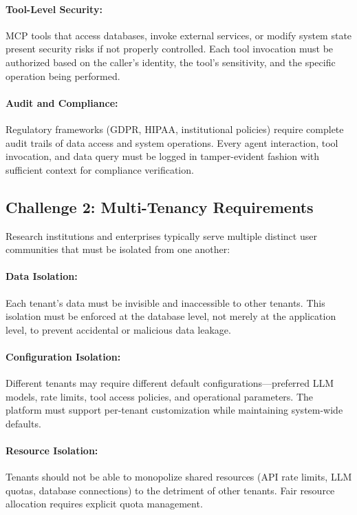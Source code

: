 \paragraph{Tool-Level Security:}
MCP tools that access databases, invoke external services, or modify system state present security risks if not properly controlled. Each tool invocation must be authorized based on the caller's identity, the tool's sensitivity, and the specific operation being performed.

\paragraph{Audit and Compliance:}
Regulatory frameworks (GDPR, HIPAA, institutional policies) require complete audit trails of data access and system operations. Every agent interaction, tool invocation, and data query must be logged in tamper-evident fashion with sufficient context for compliance verification.

\subsection{Challenge 2: Multi-Tenancy Requirements}

Research institutions and enterprises typically serve multiple distinct user communities that must be isolated from one another:

\paragraph{Data Isolation:}
Each tenant's data must be invisible and inaccessible to other tenants. This isolation must be enforced at the database level, not merely at the application level, to prevent accidental or malicious data leakage.

\paragraph{Configuration Isolation:}
Different tenants may require different default configurations---preferred LLM models, rate limits, tool access policies, and operational parameters. The platform must support per-tenant customization while maintaining system-wide defaults.

\paragraph{Resource Isolation:}
Tenants should not be able to monopolize shared resources (API rate limits, LLM quotas, database connections) to the detriment of other tenants. Fair resource allocation requires explicit quota management.

